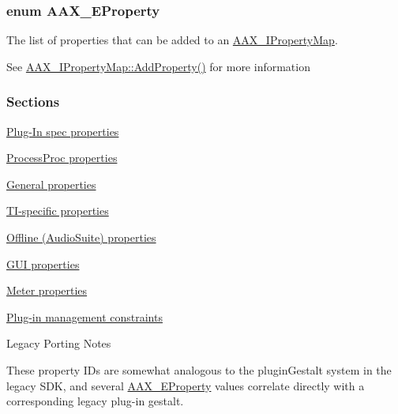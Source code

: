 \subsubsection[{A\+A\+X\+\_\+\+E\+Property}]{\setlength{\rightskip}{0pt plus 5cm}enum {\bf A\+A\+X\+\_\+\+E\+Property}}\label{a00283_a6571f4e41a5dd06e4067249228e2249e}


The list of properties that can be added to an \hyperlink{a00112}{A\+A\+X\+\_\+\+I\+Property\+Map}. 

See \hyperlink{a00112_a0997671afce9a2367662c764c1d055dd}{A\+A\+X\+\_\+\+I\+Property\+Map\+::\+Add\+Property()} for more information

\subsubsection*{Sections }


\begin{DoxyItemize}
\item \hyperlink{a00283_a6571f4e41a5dd06e4067249228e2249eadc0be12e13a5dcdf799f3405b9da27c9}{Plug-\/\+In spec properties}
\item \hyperlink{a00283_a6571f4e41a5dd06e4067249228e2249ea9a78445174f219014332c67af3b1eda6}{Process\+Proc properties}
\item \hyperlink{a00283_a6571f4e41a5dd06e4067249228e2249ea363690ab5ed1b5ee3666eda48e2b2500}{General properties}
\item \hyperlink{a00283_a6571f4e41a5dd06e4067249228e2249ea3e5b289333ba49f5a33de40d89fa4ade}{T\+I-\/specific properties}
\item \hyperlink{a00283_a6571f4e41a5dd06e4067249228e2249eae774ad8d49f9d021fc39e7d9c6f08070}{Offline (Audio\+Suite) properties}
\item \hyperlink{a00283_a6571f4e41a5dd06e4067249228e2249ea045b9ab3f8a4f63f9c62e1dffc1952aa}{G\+U\+I properties}
\item \hyperlink{a00283_a6571f4e41a5dd06e4067249228e2249eaa2aac06f000e364af20507103d6b0943}{Meter properties}
\item \hyperlink{a00283_a6571f4e41a5dd06e4067249228e2249ea16278ad29e89edd358ded16a34db4326}{Plug-\/in management constraints}
\end{DoxyItemize}

\begin{DoxyRefDesc}{Legacy Porting Notes}
\item[\hyperlink{a00384__porting_notes000039}{Legacy Porting Notes}]These property I\+Ds are somewhat analogous to the plugin\+Gestalt system in the legacy S\+D\+K, and several \hyperlink{a00283_a6571f4e41a5dd06e4067249228e2249e}{A\+A\+X\+\_\+\+E\+Property} values correlate directly with a corresponding legacy plug-\/in gestalt.\end{DoxyRefDesc}


